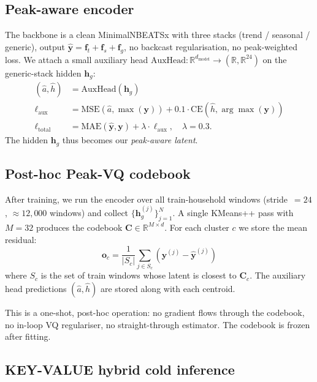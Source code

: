 \documentclass[conference]{IEEEtran}
\begin{document}
\subsection{Peak-aware encoder}\label{sec:encoder}

The backbone is a clean MinimalNBEATSx with three stacks (trend / seasonal
/ generic), output
$\hat{\mathbf{y}} = \mathbf{f}_t + \mathbf{f}_s + \mathbf{f}_g$,
no backcast regularisation, no peak-weighted loss. We attach a small
auxiliary head $\mathrm{AuxHead}\colon \mathbb{R}^{d_{\mathrm{model}}} \to
(\mathbb{R}, \mathbb{R}^{24})$ on the generic-stack hidden $\mathbf{h}_g$:
\begin{align}
(\hat a, \hat h) &= \mathrm{AuxHead}(\mathbf{h}_g)\\
\ell_{\text{aux}} &= \mathrm{MSE}(\hat a, \max(\mathbf{y})) +
                     0.1\cdot \mathrm{CE}(\hat h, \arg\max(\mathbf{y}))\\
\ell_{\text{total}} &= \mathrm{MAE}(\hat{\mathbf{y}}, \mathbf{y}) +
                       \lambda \cdot \ell_{\text{aux}},\quad \lambda = 0.3.
\end{align}
The hidden $\mathbf{h}_g$ thus becomes our \emph{peak-aware latent}.

\subsection{Post-hoc Peak-VQ codebook}\label{sec:codebook}

After training, we run the encoder over all train-household windows
(stride~$=24$, $\approx12{,}000$ windows) and collect
$\{\mathbf{h}_g^{(j)}\}_{j=1}^N$. A single KMeans++ pass with $M\!=\!32$
produces the codebook $\mathbf{C}\in\mathbb{R}^{M\times d}$. For each
cluster $c$ we store the mean residual:
\[
\mathbf{o}_c = \frac{1}{|S_c|}\sum_{j\in S_c}
                (\mathbf{y}^{(j)}-\hat{\mathbf{y}}^{(j)})
\]
where $S_c$ is the set of train windows whose latent is closest to
$\mathbf{C}_c$. The auxiliary head predictions $(\hat a, \hat h)$ are stored
along with each centroid.

This is a one-shot, post-hoc operation: no gradient flows through the
codebook, no in-loop VQ regulariser, no straight-through estimator. The
codebook is frozen after fitting.

\subsection{KEY-VALUE hybrid cold inference}\label{sec:inference}
\end{document}
